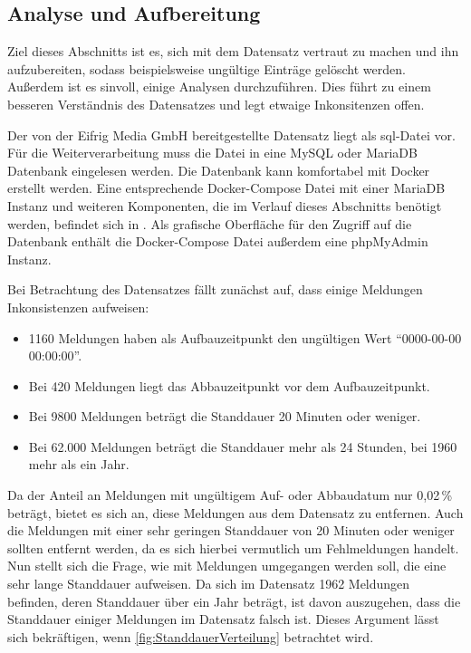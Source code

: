 \subsection{Analyse und Aufbereitung}
\label{sec:AnalyseAufbereitung}

Ziel dieses Abschnitts ist es, sich mit dem Datensatz vertraut zu machen und ihn aufzubereiten, sodass beispielsweise ungültige Einträge gelöscht werden.
Außerdem ist es sinvoll, einige Analysen durchzuführen.
Dies führt zu einem besseren Verständnis des Datensatzes und legt etwaige Inkonsitenzen offen.

Der von der Eifrig Media GmbH bereitgestellte Datensatz liegt als sql-Datei vor.
Für die Weiterverarbeitung muss die Datei in eine MySQL oder MariaDB Datenbank eingelesen werden.
Die Datenbank kann komfortabel mit Docker erstellt werden.
Eine entsprechende Docker-Compose Datei mit einer MariaDB Instanz und weiteren Komponenten, die im Verlauf dieses Abschnitts benötigt werden, befindet sich in .
Als grafische Oberfläche für den Zugriff auf die Datenbank enthält die Docker-Compose Datei außerdem eine phpMyAdmin Instanz.

Bei Betrachtung des Datensatzes fällt zunächst auf, dass einige Meldungen Inkonsistenzen aufweisen:

\begin{itemize}
    \setlength\itemsep{-15pt}
    \item 1160 Meldungen haben als Aufbauzeitpunkt den ungültigen Wert "`0000-00-00 00:00:00"'.
    \item Bei 420 Meldungen liegt das Abbauzeitpunkt vor dem Aufbauzeitpunkt.
    \item Bei 9800 Meldungen beträgt die Standdauer 20 Minuten oder weniger.
    \item Bei 62.000 Meldungen beträgt die Standdauer mehr als 24 Stunden, bei 1960 mehr als ein Jahr.
\end{itemize}

Da der Anteil an Meldungen mit ungültigem Auf- oder Abbaudatum nur 0,02\,\% beträgt, bietet es sich an, diese Meldungen aus dem Datensatz zu entfernen.
Auch die Meldungen mit einer sehr geringen Standdauer von 20 Minuten oder weniger sollten entfernt werden, da es sich hierbei vermutlich um Fehlmeldungen handelt.
Nun stellt sich die Frage, wie mit Meldungen umgegangen werden soll, die eine sehr lange Standdauer aufweisen.
Da sich im Datensatz 1962 Meldungen befinden, deren Standdauer über ein Jahr beträgt, ist davon auszugehen, dass die Standdauer einiger Meldungen im Datensatz falsch ist.
Dieses Argument lässt sich bekräftigen, wenn \autoref{fig:StanddauerVerteilung} betrachtet wird.

